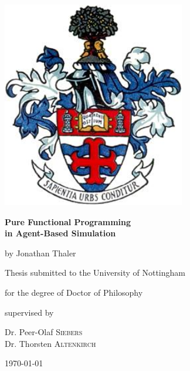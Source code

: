 \documentclass[oneside]{book}
\begin{document}
\begin{titlepage}
	\centering
	\includegraphics[width=0.60\textwidth]{./logo/coat_of_arms.jpg}\par\vspace{1cm}
	\vspace{1.5cm}
	{\huge\bfseries Pure Functional Programming \\ in Agent-Based Simulation \par}
	\vspace{2cm}
	{\Large by Jonathan Thaler \par}
	\vfill
	Thesis submitted to the University of Nottingham \par
	for the degree of Doctor of Philosophy \par
	
	\vfill
	
	supervised by\par
	Dr. Peer-Olaf \textsc{Siebers} \\
	Dr. Thorsten \textsc{Altenkirch}

	\vfill

	{\large \today\par}
\end{titlepage}
\end{document}
